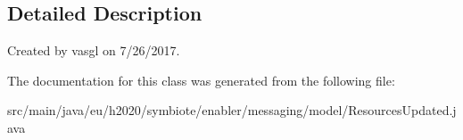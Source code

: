 \subsection{Detailed Description}
Created by vasgl on 7/26/2017. 

The documentation for this class was generated from the following file\+:\begin{DoxyCompactItemize}
\item 
src/main/java/eu/h2020/symbiote/enabler/messaging/model/Resources\+Updated.\+java\end{DoxyCompactItemize}
